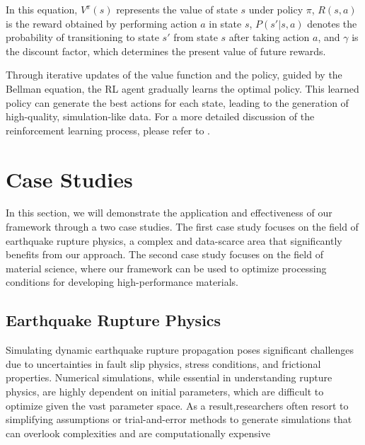 \documentclass{article}
\begin{document}
In this equation, $V^\pi(s)$ represents the value of state $s$ under policy $\pi$, $R(s,a)$ is the reward obtained by performing action $a$ in state $s$, $P(s'|s,a)$ denotes the probability of transitioning to state $s'$ from state $s$ after taking action $a$, and $\gamma$ is the discount factor, which determines the present value of future rewards.

Through iterative updates of the value function and the policy, guided by the Bellman equation, the RL agent gradually learns the optimal policy. This learned policy can generate the best actions for each state, leading to the generation of high-quality, simulation-like data. For a more detailed discussion of the reinforcement learning process, please refer to \cite{sutton2018reinforcement}.

\section{Case Studies}
In this section, we will demonstrate the application and effectiveness of our framework through a two case studies. The first case study focuses on the field of earthquake rupture physics, a complex and data-scarce area that significantly benefits from our approach. The second case study focuses on the field of material science, where our framework can be used to optimize processing conditions for developing high-performance materials.

\subsection{Earthquake Rupture Physics}
Simulating dynamic earthquake rupture propagation poses significant challenges due to uncertainties in fault slip physics, stress conditions, and frictional properties. Numerical simulations, while essential in understanding rupture physics, are highly dependent on initial parameters, which are difficult to optimize given the vast parameter space. As a result,researchers often resort to simplifying assumptions or trial-and-error methods to generate simulations that can overlook complexities and are computationally expensive~\citep{douilly20153d, ripperger2008variability, peyrat2001dynamic, ahamed2019estimating}
\end{document}

